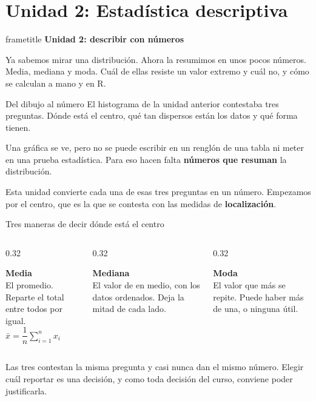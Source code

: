\documentclass[aspectratio=169,10pt]{beamer}
\newcommand{\destaca}[1]{%
  \par\vspace{3pt}\noindent
  \colorbox{azulClaro}{%
    \parbox{\dimexpr\linewidth-2\fboxsep\relax}{\vspace{3pt}#1\vspace{3pt}}}%
  \par\vspace{3pt}}
\newcommand{\hojaSesion}[2]{%
  \vfill
  \begin{beamercolorbox}[wd=\textwidth,sep=16pt,center]{frametitle}
    {\Large\bfseries #1}\\[11pt]
    \begin{minipage}{0.82\textwidth}\centering\small #2\end{minipage}
  \end{beamercolorbox}
  \vfill}
\begin{document}
\section{Unidad 2: Estadística descriptiva}
\begin{frame}[plain]
  \hojaSesion{Unidad 2: describir con números}{%
  Ya sabemos mirar una distribución. Ahora la resumimos en unos pocos números.
  Media, mediana y moda. Cuál de ellas resiste un valor extremo y cuál no, y cómo se
  calculan a mano y en R.}
\end{frame}
\begin{frame}{Del dibujo al número}
  El histograma de la unidad anterior contestaba tres preguntas. Dónde está el centro,
  qué tan dispersos están los datos y qué forma tienen.

  \vspace{0.35cm}
  \destaca{Una gráfica se ve, pero no se puede escribir en un renglón de una tabla ni
  meter en una prueba estadística. Para eso hacen falta \textbf{números que resuman} la
  distribución.}

  \vspace{0.35cm}
  Esta unidad convierte cada una de esas tres preguntas en un número. Empezamos por el
  centro, que es la que se contesta con las medidas de \textbf{localización}.
\end{frame}
\begin{frame}{Tres maneras de decir dónde está el centro}
  \begin{columns}[T]
    \begin{column}{0.32\textwidth}
      \destaca{\centering\textbf{Media}\\[4pt]
      {\small El promedio. Reparte el total entre todos por igual.}\\[6pt]
      $\bar{x} = \dfrac{1}{n}\displaystyle\sum_{i=1}^{n} x_i$}
    \end{column}
    \begin{column}{0.32\textwidth}
      \destaca{\centering\textbf{Mediana}\\[4pt]
      {\small El valor de en medio, con los datos ordenados. Deja la mitad de cada
      lado.}}
    \end{column}
    \begin{column}{0.32\textwidth}
      \destaca{\centering\textbf{Moda}\\[4pt]
      {\small El valor que más se repite. Puede haber más de una, o ninguna útil.}}
    \end{column}
  \end{columns}

  \vspace{0.5cm}
  \destaca{Las tres contestan la misma pregunta y casi nunca dan el mismo número.
  Elegir cuál reportar es una decisión, y como toda decisión del curso, conviene poder
  justificarla.}
\end{frame}
\end{document}
